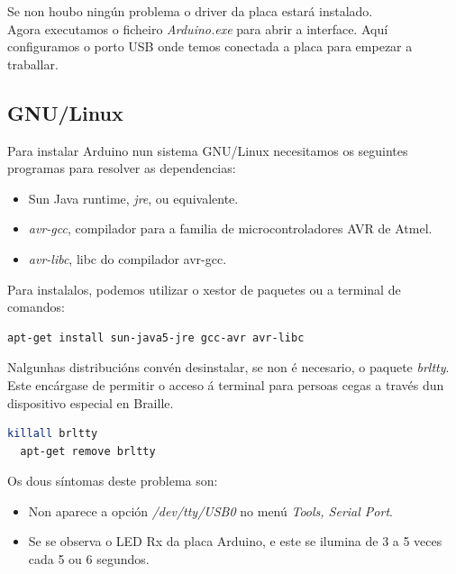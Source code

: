  Se non houbo ningún problema o driver da placa estará instalado. \\

 Agora executamos o ficheiro \textit{Arduino.exe} para abrir a interface. Aquí
 configuramos o porto USB onde temos conectada a placa para empezar a
 traballar.

 \subsection{GNU/Linux}

 Para instalar Arduino nun sistema GNU/Linux necesitamos os seguintes programas
 para resolver as dependencias:

 \begin{itemize}
  \item Sun Java runtime, \textit{jre}, ou equivalente.
  \item \textit{avr-gcc}, compilador para a familia de microcontroladores AVR de
        Atmel.
  \item \textit{avr-libc}, libc do compilador avr-gcc.
 \end{itemize}

 Para instalalos, podemos utilizar o xestor de paquetes ou a terminal de
 comandos: \\

 \begin{lstlisting}[language=bash,frame=single]
  apt-get install sun-java5-jre gcc-avr avr-libc
 \end{lstlisting}

 Nalgunhas distribucións convén desinstalar, se non é necesario, o paquete
 \textit{brltty}. Este encárgase de permitir o acceso á terminal para persoas
 cegas a través dun dispositivo especial en Braille. \\

 \begin{lstlisting}[language=bash,frame=single]
  killall brltty
  apt-get remove brltty
 \end{lstlisting}

 Os dous síntomas deste problema son:

 \begin{itemize}
  \item Non aparece a opción \textit{/dev/tty/USB0} no menú
        \textit{Tools, Serial Port}.
  \item Se se observa o LED Rx da placa Arduino, e este se ilumina de 3 a 5
        veces cada 5 ou 6 segundos.
 \end{itemize}


